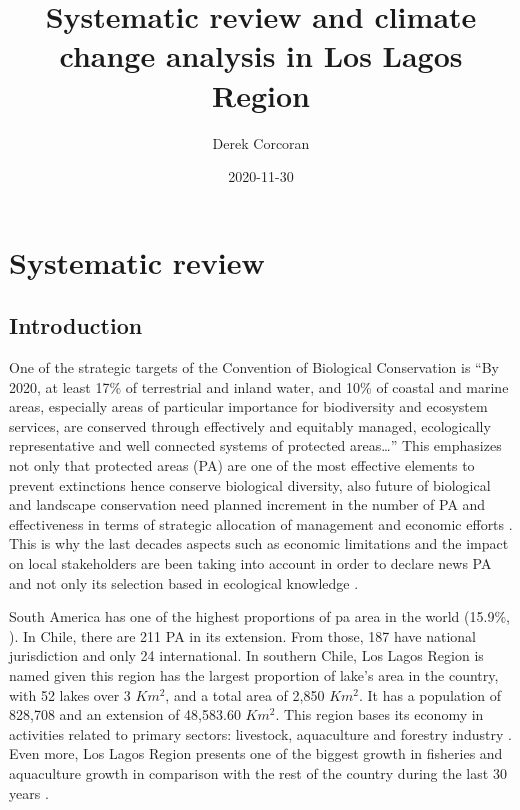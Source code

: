 \documentclass[]{article}
\title{Systematic review and climate change analysis in Los Lagos Region}
\author{Derek Corcoran}
\date{2020-11-30}
\begin{document}
\maketitle

{
\setcounter{tocdepth}{2}
\tableofcontents
}
\hypertarget{systematic-review}{%
\section{Systematic review}\label{systematic-review}}

\hypertarget{introduction}{%
\subsection{Introduction}\label{introduction}}

One of the strategic targets of the Convention of Biological Conservation is ``By 2020, at least 17\% of terrestrial and inland water, and 10\% of coastal and marine areas, especially areas of particular importance for biodiversity and ecosystem services, are conserved through effectively and equitably managed, ecologically representative and well connected systems of protected areas\ldots{}''
This emphasizes not only that protected areas (PA) are one of the most effective elements to prevent extinctions hence conserve biological diversity, also future of biological and landscape conservation need planned increment in the number of PA and effectiveness in terms of strategic allocation of management and economic efforts \citep{le2013protected, watson2014performance}.
This is why the last decades aspects such as economic limitations and the impact on local stakeholders are been taking into account in order to declare news PA and not only its selection based in ecological knowledge \citep{borrini2004indigenous}.

South America has one of the highest proportions of pa area in the world (15.9\%, \citet{ProtectedAreas}).
In Chile, there are 211 PA in its extension. From those, 187 have national jurisdiction and only 24 international.
In southern Chile, Los Lagos Region is named given this region has the largest proportion of lake's area in the country, with 52 lakes over 3 \(Km^2\), and a total area of 2,850 \(Km^2\). It has a population of 828,708 \citep{Censo2017} and an extension of 48,583.60 \(Km^2\).
This region bases its economy in activities related to primary sectors: livestock, aquaculture and forestry industry \citep{BNC_LosLagos}. Even more, Los Lagos Region presents one of the biggest growth in fisheries and aquaculture growth in comparison with the rest of the country during the last 30 years \citep{Soto-alvaradoDesarrollo}.
\end{document}
